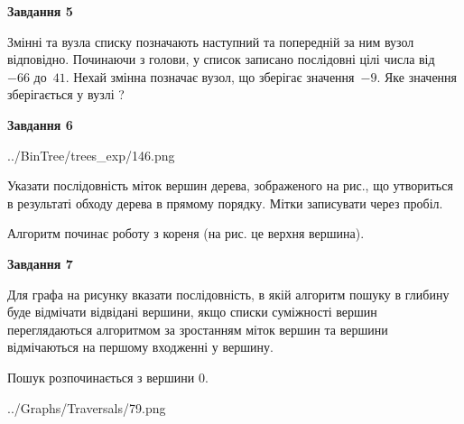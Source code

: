 \documentclass[12pt, ukrainian]{article}
\begin{document}
{\begin {large}
{\begin {center}\textbf{Завдання 5}\end {center}}\par
Змінні  та  вузла списку позначають наступний та попередній за ним вузол відповідно. Починаючи з голови, у список записано послідовні цілі числа від~$-66$ до~$41$. Нехай змінна  позначає вузол, що зберігає значення~$-9$.
Яке значення зберігається у вузлі  ?\par
\newpage

{\begin {center}\textbf{Завдання 6}\end {center}}\par

\begin{center}
	{../BinTree/trees_exp/146.png}
\end{center}
Указати послідовність міток вершин дерева, зображеного на рис., що утвориться в результаті обходу дерева в прямому порядку. Мітки записувати через пробіл.\par Алгоритм починає роботу з кореня (на рис. це верхня вершина).\par
\newpage

{\begin {center}\textbf{Завдання 7}\end {center}}\par
Для графа на рисунку вказати послідовність, в якій алгоритм пошуку в глибину буде відмічати відвідані вершини, якщо списки суміжності вершин переглядаються алгоритмом за зростанням міток вершин та вершини відмічаються на першому вход\-женні у вершину.\par
Пошук розпочинається з вершини 0.\par

\begin{center}
	{../Graphs/Traversals/79.png}
\end{center}\par
\newpage


\end{large}}
\end{document}
